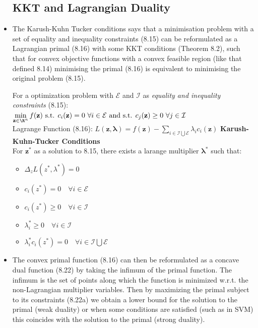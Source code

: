 \documentclass[english]{latex4ei/latex4ei_sheet}
\begin{document}
\begin{sectionbox}
\begin{itemize}
\subsection{KKT and Lagrangian Duality}
\item The Karush-Kuhn Tucker conditions says that a minimisation problem with a set of equality and inequality constraints (8.15) can be reformulated as a Lagrangian primal (8.16) with some KKT conditions (Theorem 8.2), such that for convex objective functions with a convex feasible region (like that defined 8.14) minimising the primal (8.16) is equivalent to minimising the original problem (8.15).
\begin{emphbox}
    For a optimization problem with $\mathcal{E}$ and $\mathcal{I}$ as \emph{equality and inequality constraints} (8.15):\\
    $\min\limits_{\mathbf{z}\in\R^n}f(\mathbf{z}) \ \mbox{s.t. } c_i(\mathbf{z}) = 0 \ \forall i\in\mathcal{E} \ \mbox{and s.t. } c_j(\mathbf{z}) \ge 0 \ \forall j\in\mathcal{I}$\\
    Lagrange Function (8.16): $L(\mathbf{z,\lambda})=f(\mathbf{z})-\sum\limits_{i\in\mathcal{I}\bigcup\mathcal{E}}\lambda_ic_i(\mathbf{z})$
    \textbf{Karush-Kuhn-Tucker Conditions}\\
    For $\mathbf{z^*}$ as a solution to 8.15, there exists a larange multiplier $\mathbf{\lambda^*}$ such that:\\
    \begin{itemize}
        \item $\Delta_zL(z^*,\lambda^*)=0$
        \item $c_i(z^*)=0 \quad \forall i\in\mathcal{E}$
        \item $c_i(z^*)\ge0 \quad \forall i \in\mathcal{I}$
        \item $\lambda_i^* \ge0 \quad \forall i\in\mathcal{I}$
        \item $\lambda_i^*c_i(z^*)=0 \quad \forall i\in\mathcal{I}\bigcup\mathcal{E}$
    \end{itemize}
\end{emphbox}
\item The convex primal function (8.16) can then be reformulated as a concave dual function (8.22) by taking the infimum of the primal function. The infimum is the set of points along which the function is minimized w.r.t. the non-Lagrangian multiplier variables. Then by maximizing the primal subject to its constraints (8.22a) we obtain a lower bound for the solution to the primal (weak duality) or when some conditions are satisfied (such as in SVM) this coincides with the solution to the primal (strong duality).

\end{itemize}
\end{sectionbox}
\end{document}
